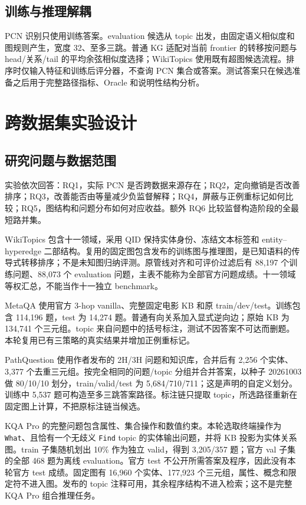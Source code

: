 \documentclass[UTF8,a4paper,10pt,fontset=fandol]{ctexart}
\begin{document}
\subsection{训练与推理解耦}
PCN 识别只使用训练答案。evaluation 候选从 topic 出发，由固定语义相似度和图规则产生，宽度 32、至多三跳。普通 KG 适配对当前 frontier 的转移按问题与 head/关系/tail 的平均余弦相似度选择；WikiTopics 使用既有超图候选流程。排序时仅输入特征和训练后评分器，不查询 PCN 集合或答案。测试答案只在候选准备之后用于完整路径指标、Oracle 和说明性结构分析。

\section{跨数据集实验设计}
\subsection{研究问题与数据范围}
实验依次回答：RQ1，实际 PCN 是否跨数据来源存在；RQ2，定向撤销是否改善排序；RQ3，改善能否由等量减少负监督解释；RQ4，屏蔽与正例重标记如何比较；RQ5，图结构和问题分布如何对应收益。额外 RQ6 比较监督构造阶段的全最短路并集。

WikiTopics 包含十一领域，采用 QID 保持实体身份、冻结文本标签和 entity--hyperedge 二部结构\cite{hyperrag}。复用的固定图包含发布的训练图与推理图，是已知语料的传导式转移排序；不是未知图归纳评测。原管线对齐和可评价过滤后有 88,197 个训练问题、88,073 个 evaluation 问题，主表不能称为全部官方问题成绩。十一领域等权汇总，不能当作十一独立 benchmark。

MetaQA 使用官方 3-hop vanilla、完整固定电影 KB 和原 train/dev/test\cite{metaqa}。训练包含 114,196 题，test 为 14,274 题。普通有向关系加入显式逆向边；原始 KB 为 134,741 个三元组。topic 来自问题中的括号标注，测试不因答案不可达而删题。本轮复用已有三策略的真实结果并增加正例重标记。

PathQuestion 使用作者发布的 2H/3H 问题和知识库\cite{pq}，合并后有 2,256 个实体、3,377 个去重三元组。按完全相同的问题/topic 分组并合并答案，以种子 20261003 做 80/10/10 划分，train/valid/test 为 5,684/710/711；这是声明的自定义划分。训练中 5,537 题可构造至多三跳答案路径。标注链只提取 topic，所选路径重新在固定图上计算，不把原标注链当候选。

KQA Pro 的完整问题包含属性、集合操作和数值约束\cite{kqa}。本轮选取终端操作为 \texttt{What}、且恰有一个无歧义 \texttt{Find} topic 的实体输出问题，并将 KB 投影为实体关系图。train 子集随机划出 10\% 作为独立 valid，得到 3,205/357 题；官方 val 子集的全部 468 题为离线 evaluation。官方 test 不公开所需答案及程序，因此没有本轮官方 test 成绩。固定图有 16,960 个实体、177,923 个三元组，属性、概念和限定符不进入图。发布的 topic 注释可用，其余程序结构不进入检索；这不是完整 KQA Pro 组合推理任务。
\end{document}
